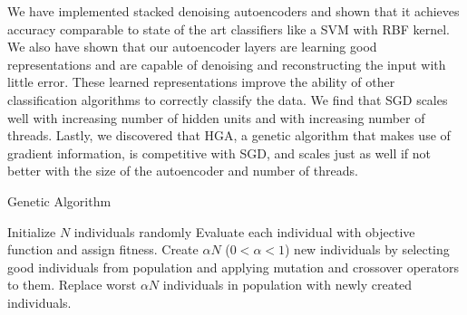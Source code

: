 We have implemented stacked denoising autoencoders and shown that it achieves accuracy comparable to state of the art classifiers like a SVM with RBF kernel. We also have shown that our autoencoder layers are learning good representations and are capable of denoising and reconstructing the input with little error. These learned representations improve the ability of other classification algorithms to correctly classify the data. We find that SGD scales well with increasing number of hidden units and with increasing number of threads. Lastly, we discovered that HGA, a genetic algorithm that makes use of gradient information, is competitive with SGD, and scales just as well if not better with the size of the autoencoder and number of threads. 

\begin{algorithm}[h]
\caption{Genetic Algorithm}
\label{alg:genetic}
\begin{algorithmic}
\STATE Initialize $N$ individuals randomly
	\STATE Evaluate each individual with objective function and assign fitness.
	\STATE Create $\alpha N$ ($0 < \alpha < 1$) new individuals by selecting good individuals from population and applying mutation and crossover operators to them.
	\STATE Replace worst $\alpha N$ individuals in population with newly created individuals.
\ENDFOR
\end{algorithmic}
\end{algorithm}
